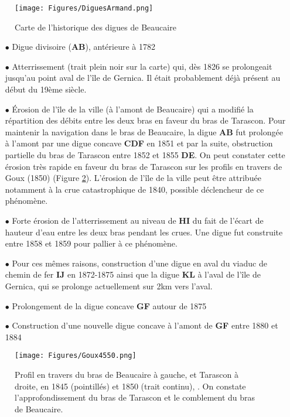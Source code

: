 \documentclass[11pt]{article}
\begin{document}
         \begin{figure}[h]
            \centering
            \texttt{[image: Figures/DiguesArmand.png]}
            \caption{Carte de l'historique des digues de Beaucaire \citep{armand_ii_1907}}
            \label{fig:DigArmand}
        \end{figure}
        
        \begin{itemize}
            \item[$\bullet$] Digue divisoire (\textbf{AB}), antérieure à 1782
            \item[$\bullet$] Atterrissement (trait plein noir sur la carte) qui, dès 1826 se prolongeait jusqu'au point aval de l'île de Gernica. Il était probablement déjà présent au début du 19ème siècle.
            \item[$\bullet$] Érosion de l'île de la ville (à l'amont de Beaucaire) qui a modifié la répartition des débits entre les deux bras en faveur du bras de Tarascon. Pour maintenir la navigation dans le bras de Beaucaire, la digue \textbf{AB} fut prolongée à l'amont par une digue concave \textbf{CDF} en 1851 et par la suite, obstruction partielle du bras de Tarascon entre 1852 et 1855 \textbf{DE}. On peut constater cette érosion très rapide en faveur du bras de Tarascon sur les profils en travers de Goux (1850) (Figure \ref{fig:ProfGoux}). L'érosion de l'île de la ville peut être attribuée notamment à la crue catastrophique de 1840, possible déclencheur de ce phénomène.
            \item[$\bullet$] Forte érosion de l'atterrissement au niveau de \textbf{HI} du fait de l'écart de hauteur d'eau entre les deux bras pendant les crues. Une digue fut construite entre 1858 et 1859 pour pallier à ce phénomène.
            \item[$\bullet$] Pour ces mêmes raisons, construction d'une digue en aval du viaduc de chemin de fer \textbf{IJ} en 1872-1875 ainsi que la digue \textbf{KL} à l'aval de l'île de Gernica, qui se prolonge actuellement sur 2km vers l'aval.
            \item[$\bullet$] Prolongement de la digue concave \textbf{GF} autour de 1875
            \item[$\bullet$] Construction d'une nouvelle digue concave à l'amont de \textbf{GF} entre 1880 et 1884
        \end{itemize}

     
        
        \begin{figure}[h]
            \centering
            \texttt{[image: Figures/Goux4550.png]}
            \caption{Profil en travers du bras de Beaucaire à gauche, et Tarascon à droite, en 1845 (pointillés) et 1850 (trait continu), \citet{goux_modification_1851}. On constate l'approfondissement du bras de Tarascon et le comblement du bras de Beaucaire.}
            \label{fig:ProfGoux}
        \end{figure}
            
\end{document}
